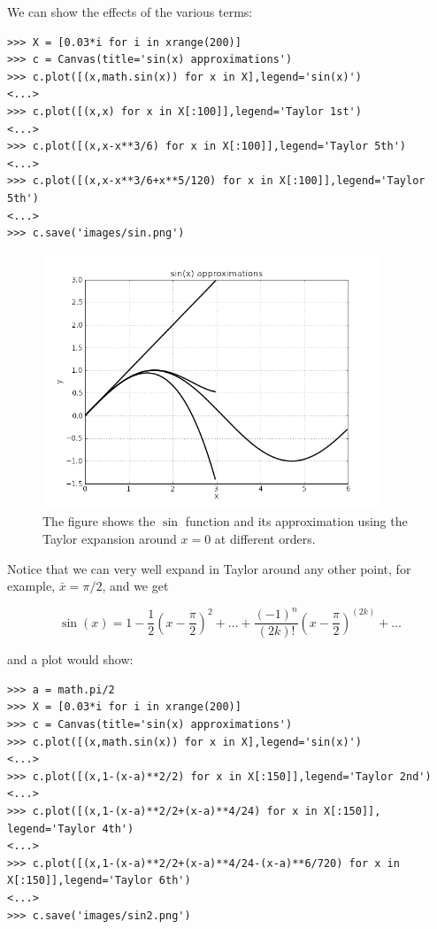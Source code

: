 \documentclass[justified,sixbynine]{tufte-book}
\def\ft{\small\tt}
\theoremstyle{plain}%
\theoremstyle{definition}
\theoremstyle{remark}
\begin{document}
\begin{fullwidth}
We can show the effects of the various terms:

\begin{lstlisting}[caption={in file: {\ft nlib.py}}]
>>> X = [0.03*i for i in xrange(200)]
>>> c = Canvas(title='sin(x) approximations')
>>> c.plot([(x,math.sin(x)) for x in X],legend='sin(x)')
<...>
>>> c.plot([(x,x) for x in X[:100]],legend='Taylor 1st')
<...>
>>> c.plot([(x,x-x**3/6) for x in X[:100]],legend='Taylor 5th')
<...>
>>> c.plot([(x,x-x**3/6+x**5/120) for x in X[:100]],legend='Taylor 5th')
<...>
>>> c.save('images/sin.png')
\end{lstlisting}

\begin{figure}[ht]
\centering\includegraphics[width=4in]{images/sin.png}
\caption{The figure shows the $\sin$ function and its approximation using the Taylor expansion around $x=0$ at different orders.}
\end{figure}

Notice that we can very well expand in Taylor around any other point, for example, $\bar x = \pi/2$, and we get

\begin{equation}
\sin(x) =  1 - \frac1{2}(x-\frac{\pi}{2})^2 + \dots + \frac{(-1)^n}{(2k)!}(x-\frac{\pi}{2})^{(2k)} +\dots 
\end{equation}

and a plot would show:

\begin{lstlisting}[caption={in file: {\ft nlib.py}}]
>>> a = math.pi/2
>>> X = [0.03*i for i in xrange(200)]
>>> c = Canvas(title='sin(x) approximations')
>>> c.plot([(x,math.sin(x)) for x in X],legend='sin(x)')
<...>
>>> c.plot([(x,1-(x-a)**2/2) for x in X[:150]],legend='Taylor 2nd')
<...>
>>> c.plot([(x,1-(x-a)**2/2+(x-a)**4/24) for x in X[:150]], legend='Taylor 4th')
<...>
>>> c.plot([(x,1-(x-a)**2/2+(x-a)**4/24-(x-a)**6/720) for x in X[:150]],legend='Taylor 6th')
<...>
>>> c.save('images/sin2.png')
\end{lstlisting}


\end{fullwidth}
\end{document}
